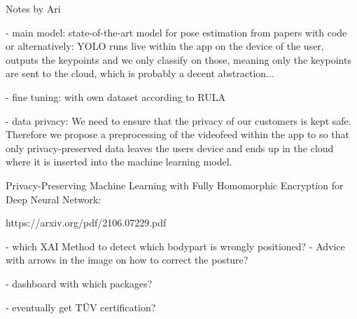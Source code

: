 
Notes by Ari

- main model:
state-of-the-art model for pose estimation from papers with code
or alternatively:
YOLO runs live within the app on the device of the user, outputs the keypoints and we only classify on those, meaning only the keypoints are sent to the cloud, which is probably a decent abstraction...

- fine tuning:
with own dataset according to RULA

- data privacy:
We need to ensure that the privacy of our customers is kept safe. Therefore we propose a preprocessing of the videofeed within the app to so that only privacy-preserved data leaves the users device and ends up in the cloud where it is inserted into the machine learning model.

Privacy-Preserving Machine Learning with Fully Homomorphic Encryption for Deep Neural Network:

https://arxiv.org/pdf/2106.07229.pdf


- which XAI Method to detect which bodypart is wrongly positioned?
- Advice with arrows in the image on how to correct the posture?

- dashboard with which packages?

- eventually get TÜV certification?

